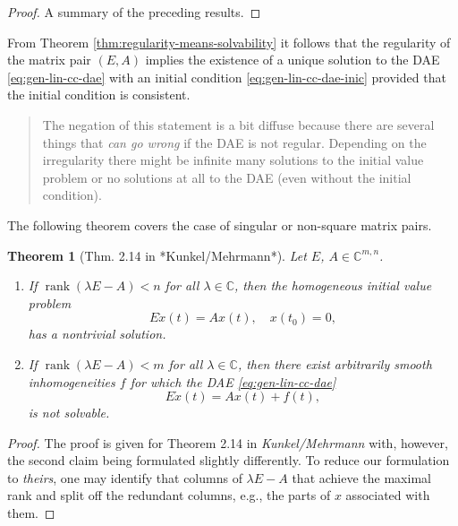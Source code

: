 \documentclass[]{book}
\newenvironment {JHSAYS} [0] {\begin{quote}\color{jhsc}} {\end{quote}}
\newtheorem{theorem}{Theorem}[chapter]
\theoremstyle{definition}
\theoremstyle{definition}
\theoremstyle{definition}
\theoremstyle{definition}
\theoremstyle{remark}
\begin{document}
\begin{proof}
{}A summary of the preceding results.
\end{proof}

From Theorem \ref{thm:regularity-means-solvability} it follows that the regularity of the matrix pair \((E, A)\) implies the existence of a unique solution to the DAE \eqref{eq:gen-lin-cc-dae} with an initial condition \eqref{eq:gen-lin-cc-dae-inic} provided that the initial condition is consistent.

\begin{JHSAYS}
The negation of this statement is a bit diffuse because there are
several things that \emph{can go wrong} if the DAE is not regular.
Depending on the irregularity there might be infinite many solutions to
the initial value problem or no solutions at all to the DAE (even
without the initial condition).
\end{JHSAYS}

The following theorem covers the case of singular or non-square matrix pairs.

\begin{theorem}[Thm. 2.14 in *Kunkel/Mehrmann*]
\protect\hypertarget{thm:unnamed-chunk-22}{}{\label{thm:unnamed-chunk-22} {} }Let \(E\), \(A\in \mathbb C^{m,n}\).

\begin{enumerate}
\def\labelenumi{\arabic{enumi}.}
\item
  If \(\operatorname{rank}(\lambda E -A) < n\) for all \(\lambda \in \mathbb C\), then the \emph{homogeneous} initial value problem
  \[ 
  E\dot x(t) = Ax(t), \quad x(t_0) = 0, 
  \]
  has a nontrivial solution.
\item
  If \(\operatorname{rank}(\lambda E -A) < m\) for all \(\lambda\in \mathbb C\), then there exist arbitrarily smooth inhomogeneities \(f\) for which the DAE \eqref{eq:gen-lin-cc-dae}
  \[ 
  E\dot x(t) = Ax(t)+f(t),
  \]
  is not solvable.
\end{enumerate}
\end{theorem}

\begin{proof}
{}The proof is given for Theorem 2.14 in \emph{Kunkel/Mehrmann} with, however, the second claim being formulated slightly differently. To reduce our formulation to \emph{theirs}, one may identify that columns of \(\lambda E - A\) that achieve the maximal rank and split off the redundant columns, e.g., the parts of \(x\) associated with them.
\end{proof}
\end{document}
